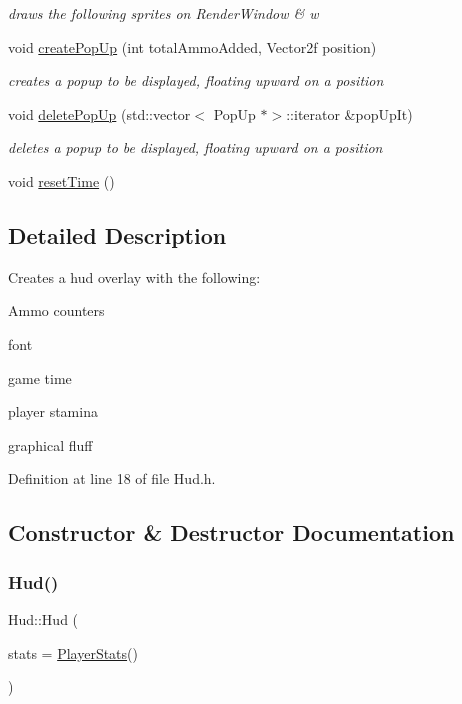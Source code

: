 \begin{DoxyCompactItemize}
\begin{DoxyCompactList}\small\item\em draws the following sprites on Render\+Window \& w \end{DoxyCompactList}\item 
void \hyperlink{class_hud_accfaddbefc4b7ba1ecf64d3b32af2d24}{create\+Pop\+Up} (int total\+Ammo\+Added, Vector2f position)
\begin{DoxyCompactList}\small\item\em creates a popup to be displayed, floating upward on a position \end{DoxyCompactList}\item 
void \hyperlink{class_hud_a6c8effbe343872e65e9d02f0509be0d6}{delete\+Pop\+Up} (std\+::vector$<$ Pop\+Up $\ast$$>$\+::iterator \&pop\+Up\+It)
\begin{DoxyCompactList}\small\item\em deletes a popup to be displayed, floating upward on a position \end{DoxyCompactList}\item 
void \hyperlink{class_hud_a2404ab603f0646b3b320616e7dfbc957}{reset\+Time} ()
\end{DoxyCompactItemize}


\subsection{Detailed Description}
Creates a hud overlay with the following\+: 


\begin{DoxyItemize}
\item Ammo counters
\item font
\item game time
\item player stamina
\item graphical fluff 
\end{DoxyItemize}

Definition at line 18 of file Hud.\+h.



\subsection{Constructor \& Destructor Documentation}
\mbox{\label{class_hud_a70b69eaa00542d46595069dafc768913}} 
\subsubsection{\texorpdfstring{Hud()}{Hud()}}
{\footnotesize\ttfamily Hud\+::\+Hud (\begin{DoxyParamCaption}\item[{\hyperlink{struct_player_stats}{Player\+Stats} \&}]{stats = {\ttfamily \hyperlink{struct_player_stats}{Player\+Stats}()} }\end{DoxyParamCaption})}




